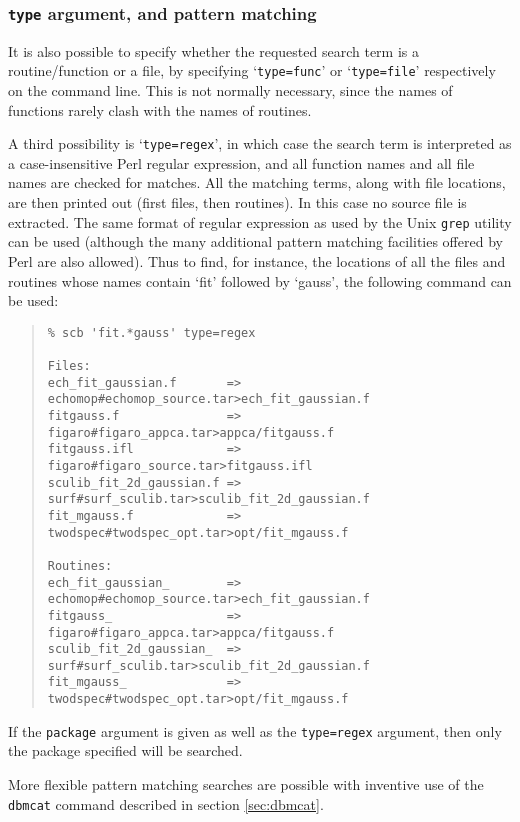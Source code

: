 \documentclass[twoside,11pt]{article}
\newcommand{\xlabel}[1]{}
\renewcommand{\_}{\texttt{\symbol{95}}}
\begin{document}
\subsubsection{\xlabel{sec:extract-type}\label{sec:extract-type}{\tt type} argument, and pattern matching}

It is also possible to specify whether the requested search
term is a routine/function or a file, by specifying `{\tt type=func}'
or `{\tt type=file}' respectively on the command line.  This is not
normally necessary, since the names of functions rarely clash with
the names of routines.

A third possibility is `{\tt type=regex}', in which case the
search term is interpreted as a case-insensitive
Perl regular expression, and
all function names and all file names are checked for matches.
All the matching terms, along with file locations, are then printed out
(first files, then routines).
In this case no source file is extracted.
The same format of regular expression as used by the Unix {\tt grep}
utility can be used
(although the many additional pattern matching facilities
offered by Perl are also allowed).
Thus to find, for instance, the locations of
all the files and routines whose names contain `fit' followed
by `gauss', the following command can be used:
\begin{quote}
\begin{verbatim}
% scb 'fit.*gauss' type=regex

Files:
ech_fit_gaussian.f       => echomop#echomop_source.tar>ech_fit_gaussian.f
fitgauss.f               => figaro#figaro_appca.tar>appca/fitgauss.f
fitgauss.ifl             => figaro#figaro_source.tar>fitgauss.ifl
sculib_fit_2d_gaussian.f => surf#surf_sculib.tar>sculib_fit_2d_gaussian.f
fit_mgauss.f             => twodspec#twodspec_opt.tar>opt/fit_mgauss.f

Routines:
ech_fit_gaussian_        => echomop#echomop_source.tar>ech_fit_gaussian.f
fitgauss_                => figaro#figaro_appca.tar>appca/fitgauss.f
sculib_fit_2d_gaussian_  => surf#surf_sculib.tar>sculib_fit_2d_gaussian.f
fit_mgauss_              => twodspec#twodspec_opt.tar>opt/fit_mgauss.f
\end{verbatim}
\end{quote}
If the {\tt package} argument is given as well as the {\tt type=regex}
argument, then only the package specified will be searched.

More flexible pattern matching searches are possible
with inventive use of the {\tt dbmcat} command described
in section \ref{sec:dbmcat}.
\end{document}
